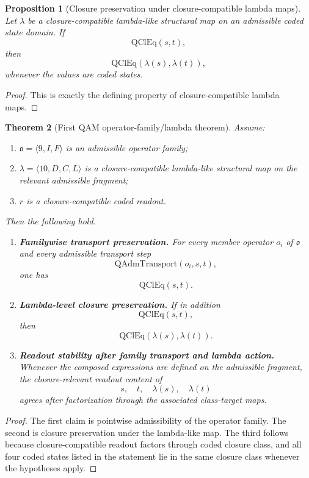 \documentclass[12pt,a4paper]{article}
\newtheorem{theorem}{Theorem}[section]
\newtheorem{proposition}[theorem]{Proposition}
\begin{document}
\begin{proposition}[Closure preservation under closure-compatible lambda maps]
Let $\lambda$ be a closure-compatible lambda-like structural map on an admissible coded state domain. If
\[
\mathrm{QClEq}(s,t),
\]
then
\[
\mathrm{QClEq}(\lambda(s),\lambda(t)),
\]
whenever the values are coded states.
\end{proposition}

\begin{proof}
This is exactly the defining property of closure-compatible lambda maps.
\end{proof}

\begin{theorem}[First QAM operator-family/lambda theorem]
Assume:
\begin{enumerate}
\item $\mathfrak{o}=\langle 9,I,F\rangle$ is an admissible operator family;
\item $\lambda=\langle 10,D,C,L\rangle$ is a closure-compatible lambda-like structural map on the relevant admissible fragment;
\item $r$ is a closure-compatible coded readout.
\end{enumerate}
Then the following hold.
\begin{enumerate}
\item \textbf{Familywise transport preservation.} 
For every member operator $o_i$ of $\mathfrak{o}$ and every admissible transport step
\[
\mathrm{QAdmTransport}(o_i,s,t),
\]
one has
\[
\mathrm{QClEq}(s,t).
\]

\item \textbf{Lambda-level closure preservation.} 
If in addition
\[
\mathrm{QClEq}(s,t),
\]
then
\[
\mathrm{QClEq}(\lambda(s),\lambda(t)).
\]

\item \textbf{Readout stability after family transport and lambda action.} 
Whenever the composed expressions are defined on the admissible fragment, the closure-relevant readout content of
\[
s,
\quad t,
\quad \lambda(s),
\quad \lambda(t)
\]
agrees after factorization through the associated class-target maps.
\end{enumerate}
\end{theorem}

\begin{proof}
The first claim is pointwise admissibility of the operator family. The second is closure preservation under the lambda-like map. The third follows because closure-compatible readout factors through coded closure class, and all four coded states listed in the statement lie in the same closure class whenever the hypotheses apply.
\end{proof}
\end{document}
